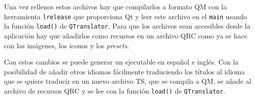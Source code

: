 Una vez rellenos estos archivos hay que compilarlos a formato QM con la herramienta \texttt{lrelease} que proporciona Qt y leer este archivo en el \texttt{main} usando la función \texttt{load()} de \texttt{QTranslator}. Para que los archivos sean accesibles desde la aplicación hay que añadirlos como recursos en un archivo QRC como ya se hace con las imágenes, los iconos y los \textit{presets}.

Con estos cambios se puede generar un ejecutable en español e inglés. Con la posibilidad de añadir otros idiomas fácilmente traduciendo los títulos al idioma que se quiere traducir en un nuevo archivo TS, que se compila a QM, se añade al archivo de recursos QRC y se lee con la función \texttt{load()} de \texttt{QTranslator}.